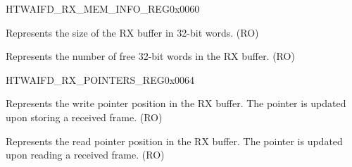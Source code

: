 \begin{register}{H}{TWAIFD\_RX\_MEM\_INFO\_REG}{0x0060}\label{regdesc:TWAIFDRXMEMINFOREG}
%
%
%
%
\regnewline%
\begin{regdesc}\begin{reglist}
\label{fielddesc:TWAIFDRXBUFFSIZE}\item [TWAIFD\_RX\_BUFF\_SIZE] Represents the size of the RX buffer in 32-bit words. (RO)
\label{fielddesc:TWAIFDRXFREE}\item [TWAIFD\_RX\_FREE] Represents the number of free 32-bit words in the RX buffer. (RO)
\end{reglist}\end{regdesc}
\end{register}


\begin{register}{H}{TWAIFD\_RX\_POINTERS\_REG}{0x0064}\label{regdesc:TWAIFDRXPOINTERSREG}
%
%
%
%
\regnewline%
\begin{regdesc}\begin{reglist}
\label{fielddesc:TWAIFDRXWPP}\item [TWAIFD\_RX\_WPP] Represents the write pointer position in the RX buffer. The pointer is updated upon storing a received frame. (RO)
\label{fielddesc:TWAIFDRXRPP}\item [TWAIFD\_RX\_RPP] Represents the read pointer position in the RX buffer. The pointer is updated upon reading a received frame. (RO)
\end{reglist}\end{regdesc}
\end{register}


